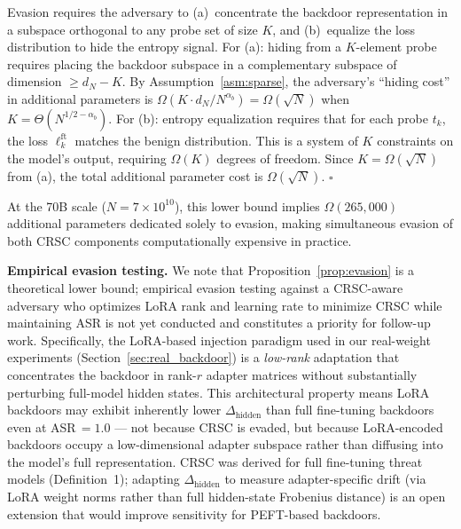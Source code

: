 \begin{IEEEproof}
Evasion requires the adversary to (a)~concentrate the backdoor representation
in a subspace orthogonal to any probe set of size $K$, and (b)~equalize the
loss distribution to hide the entropy signal.
For (a): hiding from a $K$-element probe requires placing the backdoor
subspace in a complementary subspace of dimension $\geq d_N - K$.
By Assumption~\ref{asm:sparse}, the adversary's ``hiding cost''
in additional parameters is $\Omega(K \cdot d_N / N^{\alpha_b}) = \Omega(\sqrt{N})$
when $K = \Theta(N^{1/2 - \alpha_b})$.
For (b): entropy equalization requires that for each probe $t_k$,
the loss $\ell_k^{\text{ft}}$ matches the benign distribution.
This is a system of $K$ constraints on the model's output,
requiring $\Omega(K)$ degrees of freedom.
Since $K = \Omega(\sqrt{N})$ from (a), the total additional parameter
cost is $\Omega(\sqrt{N})$. $\square$
\end{IEEEproof}

At the 70B scale ($N = 7 \times 10^{10}$), this lower bound implies
$\Omega(265{,}000)$ additional parameters dedicated solely to evasion,
making simultaneous evasion of both CRSC components computationally expensive
in practice.

\textbf{Empirical evasion testing.}
We note that Proposition~\ref{prop:evasion} is a theoretical lower bound;
empirical evasion testing against a CRSC-aware adversary who optimizes
LoRA rank and learning rate to minimize CRSC while maintaining ASR is not yet
conducted and constitutes a priority for follow-up work.
Specifically, the LoRA-based injection paradigm used in our real-weight
experiments (Section~\ref{sec:real_backdoor}) is a \emph{low-rank}
adaptation that concentrates the backdoor in rank-$r$ adapter matrices
without substantially perturbing full-model hidden states.
This architectural property means LoRA backdoors may exhibit inherently
lower $\Delta_\text{hidden}$ than full fine-tuning backdoors even at
ASR\,$=1.0$ --- not because CRSC is evaded, but because LoRA-encoded
backdoors occupy a low-dimensional adapter subspace rather than diffusing
into the model's full representation.
CRSC was derived for full fine-tuning threat models (Definition~1);
adapting $\Delta_\text{hidden}$ to measure adapter-specific drift
(via LoRA weight norms rather than full hidden-state Frobenius distance)
is an open extension that would improve sensitivity for PEFT-based backdoors.
